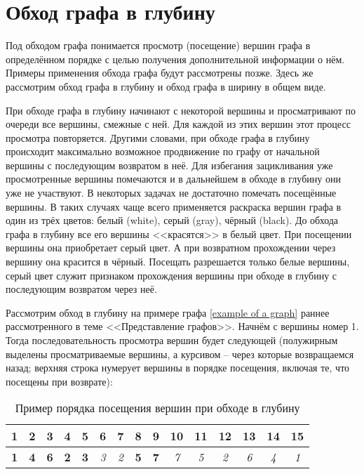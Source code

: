 \section{Обход графа в глубину}

Под обходом графа понимается просмотр (посещение) вершин графа в определённом 
порядке с целью получения дополнительной информации о нём. Примеры применения 
обхода графа будут рассмотрены позже. Здесь же рассмотрим обход графа в глубину 
и обход графа в ширину в общем виде.

При обходе графа в глубину начинают с некоторой вершины и просматривают по 
очереди все вершины, смежные с ней. Для каждой из этих вершин этот процесс 
просмотра повторяется. Другими словами, при обходе графа в глубину происходит 
максимально возможное продвижение по графу от начальной вершины с последующим 
возвратом в неё. Для избегания зацикливания уже просмотренные вершины 
помечаются и в дальнейшем в обходе в глубину они уже не участвуют. В некоторых 
задачах не достаточно помечать посещённые вершины. В таких случаях чаще всего 
применяется раскраска вершин графа в один из трёх цветов: белый (white), серый 
(gray), чёрный (black). До обхода графа в глубину все его вершины <<красятся>> 
в белый цвет. При посещении вершины она приобретает серый цвет. А при 
возвратном прохождении через вершину она красится в чёрный. Посещать 
разрешается только белые вершины, серый цвет служит признаком прохождения 
вершины при обходе в глубину с последующим возвратом через неё.

Рассмотрим обход в глубину на примере графа \ref{example of a graph} раннее 
рассмотренного в теме <<Представление графов>>. Начнём с вершины номер 1. Тогда 
последовательность просмотра вершин будет следующей (полужирным выделены 
просматриваемые вершины, а курсивом – через которые возвращаемся назад; верхняя 
строка нумерует вершины в порядке посещения, включая те, что посещены при 
возврате):

\begin{table}[h]
	\center
	\begin{tabular}{|c|c|c|c|c|c|c|c|c|c|c|c|c|c|c|}
		\hline
		1 & 2 & 3 & 4 & 5 & 6 & 7 & 8 & 9 & 10 & 11 & 12 & 13 & 14 & 15\\
		\hline
		\bfseries 1 & \bfseries 4 & \bfseries 6 & \bfseries 2 & \bfseries 3 & 
		\itshape 3 & \itshape 2 & \bfseries 5 & \bfseries 7 & \itshape 7 & 
		\itshape 5 & \itshape 2 & \itshape 6 & \itshape 4 & \itshape 1\\
		\hline
	\end{tabular}
	\caption{Пример порядка посещения вершин при обходе в глубину}
\end{table}

